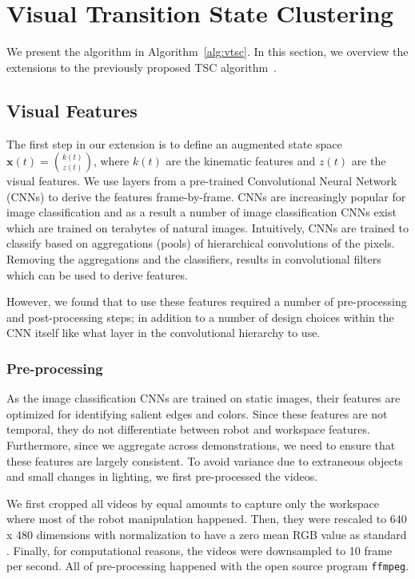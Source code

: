 \documentclass[0-main.tex]{subfiles}
\begin{document}
\setlength{\textfloatsep}{5pt}%

\section{Visual Transition State Clustering}
We present the \tsc algorithm in Algorithm~\ref{alg:vtsc}.
In this section, we overview the extensions to the previously proposed TSC algorithm~\cite{krishnan2015tsc}.

\subsection{Visual Features}
The first step in our extension is to define an augmented state space $\mathbf{x}(t) = \binom{k(t)}{z(t)}$, where $k(t)$ are the kinematic features and $z(t)$ are the visual features.
We use layers from a pre-trained Convolutional Neural Network (CNNs) to derive the features frame-by-frame.
CNNs are increasingly popular for image classification and as a result a number of image classification CNNs exist which are trained on terabytes of natural images.
Intuitively, CNNs are trained to classify based on aggregations (pools) of hierarchical convolutions of the pixels.
Removing the aggregations and the classifiers, results in convolutional filters which can be used to derive features.

However, we found that to use these features required a number of pre-processing and post-processing steps; in addition to a number of design choices within the CNN itself like what layer in the convolutional hierarchy to use.

\subsubsection{Pre-processing}
As the image classification CNNs are trained on static images, their features are optimized for identifying salient edges and colors.
Since these features are not temporal, they do not differentiate between robot and workspace features.
Furthermore, since we aggregate across demonstrations, we need to ensure that these features are largely consistent.
To avoid variance due to extraneous objects and small changes in lighting, we first pre-processed the videos.

We first cropped all videos by equal amounts to capture only the workspace where most of the robot manipulation happened. 
Then, they were rescaled to 640 x 480 dimensions with normalization to have a zero mean RGB value as standard \cite{krizhevsky2012imagenet,simonyan2014very}. 
Finally, for computational reasons, the videos were downsampled to 10 frame per second.  
All of pre-processing happened with the open source program \texttt{ffmpeg}.
\end{document}
